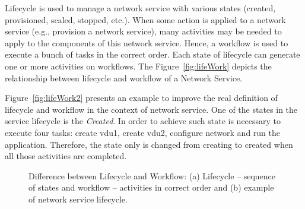 Lifecycle is used to manage a network service with various states (created, provisioned, scaled, stopped, etc.). When some action is applied to a network service (e.g., provision a network service), many activities may be needed to apply to the components of this network service. Hence, a workflow is used to execute a bunch of tasks in the correct order. Each state of lifecycle can generate one or more activities on workflows. The Figure~\ref{fig:lifeWork} depicts the relationship between lifecycle and workflow of a Network Service. 

Figure~\ref{fig:lifeWork2} presents an example to improve the real definition of lifecycle and workflow in the context of network service. One of the states in the service lifecycle is the \textit{Created}. In order to achieve such state is necessary to execute four tasks: create \gls{vdu}1, create \gls{vdu}2, configure network and run the application. Therefore, the state only is changed from creating to created when all those activities are completed.

\begin{figure}[thpb]
\centering
 \caption{Difference between Lifecycle and Workflow: (a) Lifecycle -- sequence of states and workflow -- activities in correct order and (b) example of network service lifecycle.}
 \label{fig:lifeworkflow}  
\end{figure}

